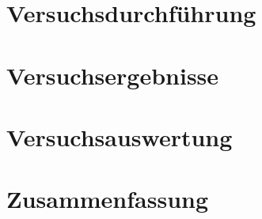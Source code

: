 %



%


\pagestyle{empty}

%
\tableofcontents
%
\newpage
\pagestyle{headings}
%

%
\section{Versuchsdurchführung}
\label{sec:Durchführung}

\clearpage
%
\section{Versuchsergebnisse}
\label{sec:Ergebnisse}

\clearpage
%
\section{Versuchsauswertung}
\label{sec:Auswertung}

\clearpage
%
\section{Zusammenfassung}
\label{sec:Zusammenfassung}

\clearpage
%
\listoftables
\newpage
%
\listoffigures
\newpage
%
\lstlistoflistings
\newpage
%

\newpage
%
\appendices

%

%
